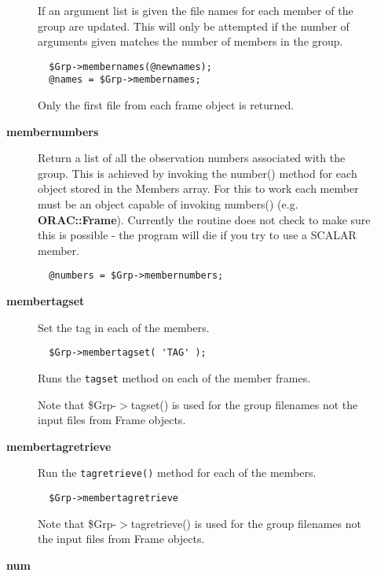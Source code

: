 \begin{description}
\begin{description}
If an argument list is given the file names for each member of the
group are updated. This will only be attempted if the number of
arguments given matches the number of members in the group.

\begin{verbatim}
  $Grp->membernames(@newnames);
  @names = $Grp->membernames;
\end{verbatim}


Only the first file from each frame object is returned.


\item[{\textbf{membernumbers}}] \mbox{}

Return a list of all the observation numbers associated with
the group. This is achieved by invoking the number() method for
each object stored in the Members array.
For this to work each member must be an object capable of invoking
numbers() (e.g. \textbf{ORAC::Frame}). Currently the routine does not check
to make sure this is possible - the program will die if you try
to use a SCALAR member.

\begin{verbatim}
  @numbers = $Grp->membernumbers;
\end{verbatim}

\item[{\textbf{membertagset}}] \mbox{}

Set the tag in each of the members.

\begin{verbatim}
  $Grp->membertagset( 'TAG' );
\end{verbatim}


Runs the \texttt{tagset} method on each of the member frames.



Note that \$Grp-$>$tagset() is used for the group filenames
not the input files from Frame objects.


\item[{\textbf{membertagretrieve}}] \mbox{}

Run the \texttt{tagretrieve()} method for each of the members.

\begin{verbatim}
  $Grp->membertagretrieve
\end{verbatim}


Note that \$Grp-$>$tagretrieve() is used for the group filenames
not the input files from Frame objects.


\item[{\textbf{num}}] \mbox{}


\end{description}
\end{description}

